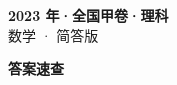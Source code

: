 \documentclass[zihao=-4, a4paper]{ctexart}
\begin{document}
\begin{center}
  {\Large\bfseries 2023 年·全国甲卷·理科}\\[4pt]
  {\large 数学 · 简答版}
\end{center}
\medskip
{}

\clearpage
{}
\begin{center}{\Large\bfseries 答案速查}\end{center}
\medskip

\end{document}
